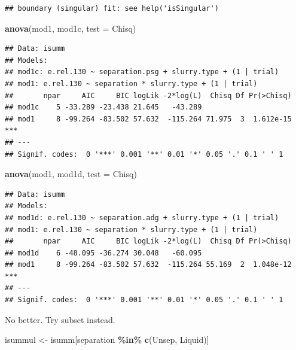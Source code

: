 \documentclass[
]{article}
\newenvironment{Shaded}{\begin{snugshade}}{\end{snugshade}}
\newcommand{\AttributeTok}[1]{\textcolor[rgb]{0.13,0.29,0.53}{#1}}
\newcommand{\FunctionTok}[1]{\textcolor[rgb]{0.13,0.29,0.53}{\textbf{#1}}}
\newcommand{\NormalTok}[1]{#1}
\newcommand{\OtherTok}[1]{\textcolor[rgb]{0.56,0.35,0.01}{#1}}
\newcommand{\SpecialCharTok}[1]{\textcolor[rgb]{0.81,0.36,0.00}{\textbf{#1}}}
\newcommand{\StringTok}[1]{\textcolor[rgb]{0.31,0.60,0.02}{#1}}
\begin{document}
\begin{verbatim}
## boundary (singular) fit: see help('isSingular')
\end{verbatim}

\begin{Shaded}
\begin{Highlighting}[]
\FunctionTok{anova}\NormalTok{(mod1, mod1c, }\AttributeTok{test =} \StringTok{\textquotesingle{}Chisq\textquotesingle{}}\NormalTok{)}
\end{Highlighting}
\end{Shaded}

\begin{verbatim}
## Data: isumm
## Models:
## mod1c: e.rel.130 ~ separation.psg + slurry.type + (1 | trial)
## mod1: e.rel.130 ~ separation * slurry.type + (1 | trial)
##       npar     AIC     BIC logLik -2*log(L)  Chisq Df Pr(>Chisq)    
## mod1c    5 -33.289 -23.438 21.645   -43.289                         
## mod1     8 -99.264 -83.502 57.632  -115.264 71.975  3  1.612e-15 ***
## ---
## Signif. codes:  0 '***' 0.001 '**' 0.01 '*' 0.05 '.' 0.1 ' ' 1
\end{verbatim}

\begin{Shaded}
\begin{Highlighting}[]
\FunctionTok{anova}\NormalTok{(mod1, mod1d, }\AttributeTok{test =} \StringTok{\textquotesingle{}Chisq\textquotesingle{}}\NormalTok{)}
\end{Highlighting}
\end{Shaded}

\begin{verbatim}
## Data: isumm
## Models:
## mod1d: e.rel.130 ~ separation.adg + slurry.type + (1 | trial)
## mod1: e.rel.130 ~ separation * slurry.type + (1 | trial)
##       npar     AIC     BIC logLik -2*log(L)  Chisq Df Pr(>Chisq)    
## mod1d    6 -48.095 -36.274 30.048   -60.095                         
## mod1     8 -99.264 -83.502 57.632  -115.264 55.169  2  1.048e-12 ***
## ---
## Signif. codes:  0 '***' 0.001 '**' 0.01 '*' 0.05 '.' 0.1 ' ' 1
\end{verbatim}

No better. Try subset instead.

\begin{Shaded}
\begin{Highlighting}[]
\NormalTok{isummul }\OtherTok{\textless{}{-}}\NormalTok{ isumm[separation }\SpecialCharTok{\%in\%} \FunctionTok{c}\NormalTok{(}\StringTok{\textquotesingle{}Unsep\textquotesingle{}}\NormalTok{, }\StringTok{\textquotesingle{}Liquid\textquotesingle{}}\NormalTok{)]}
\end{Highlighting}
\end{Shaded}
\end{document}
